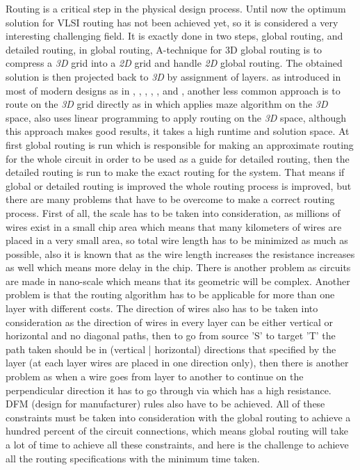 \documentclass[conference]{IEEEtran}
\begin{document}
Routing is a critical step in the physical design process. Until now the optimum solution for VLSI routing has not been achieved yet, so it is considered a very interesting challenging field. It is exactly done in two steps, global routing, and detailed routing, in global routing, A-technique for 3D global routing is to compress a \textit{3D} grid into a \textit{2D} grid and handle \textit{2D} global routing. The obtained solution is then projected back to \textit{3D} by assignment of layers. as introduced in most of modern designs as in \cite{b1}, \cite{b10}, \cite{b3}, \cite{b4}, \cite{b5}, and \cite{b6}, another less common approach is to route on the \textit{3D} grid directly as in \cite{b9} which applies maze algorithm on the \textit{3D} space, also \cite{b14} uses linear programming to apply routing on the \textit{3D} space, although this approach makes good results, it takes a high runtime and solution space. At first global routing is run which is responsible for making an approximate routing for the whole circuit in order to be used as a guide for detailed routing, then the detailed routing is run to make the exact routing for the system. That means if global or detailed routing is improved the whole routing process is improved, but there are many problems that have to be overcome to make a correct routing process. First of all, the scale has to be taken into consideration, as millions of wires exist in a small chip area which means that many kilometers of wires are placed in a very small area, so total wire length has to be minimized as much as possible, also it is known that as the wire length increases the resistance increases as well which means more delay in the chip. There is another problem as circuits are made in nano-scale which means that its geometric will be complex. Another problem is that the routing algorithm has to be applicable for more than one layer with different costs. The direction of wires also has to be taken into consideration as the direction of wires in every layer can be either vertical or horizontal and no diagonal paths, then to go from source 'S' to target 'T' the path taken should be in (vertical | horizontal) directions that specified by the layer (at each layer wires are placed in one direction only), then there is another problem as when a wire goes from layer to another to continue on the perpendicular direction it has to go through via which has a high resistance. DFM (design for manufacturer) rules also have to be achieved. All of these constraints must be taken into consideration with the global routing to achieve a hundred percent of the circuit connections, which means global routing will take a lot of time to achieve all these constraints, and here is the challenge to achieve all the routing specifications with the minimum time taken. 
\end{document}
